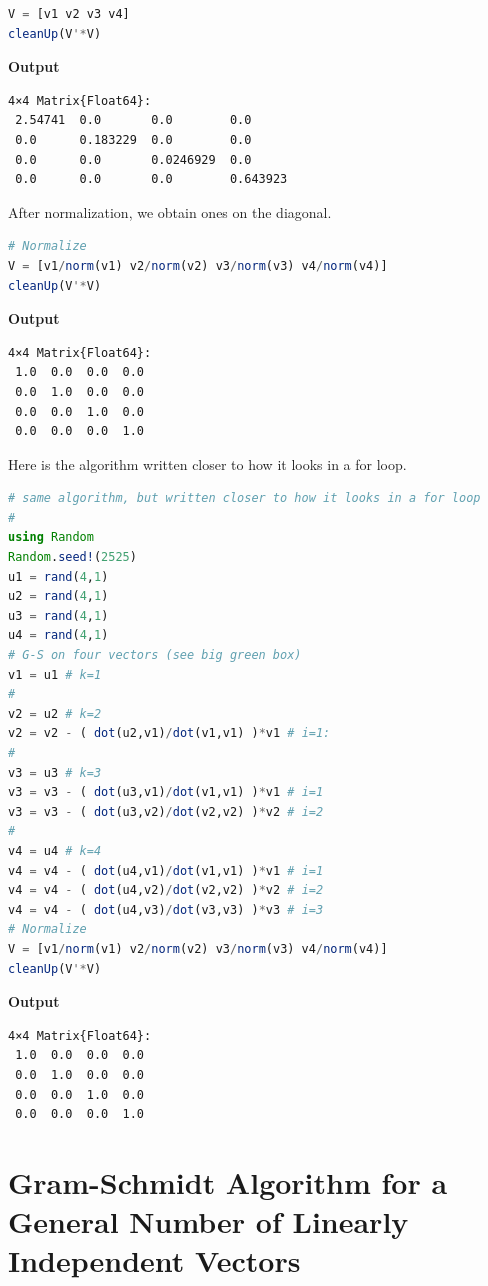 \begin{lstlisting}[language=Julia,style=mystyle]
V = [v1 v2 v3 v4]
cleanUp(V'*V)
\end{lstlisting}
\textbf{Output} 
\begin{verbatim}
4×4 Matrix{Float64}:
 2.54741  0.0       0.0        0.0
 0.0      0.183229  0.0        0.0
 0.0      0.0       0.0246929  0.0
 0.0      0.0       0.0        0.643923
\end{verbatim}

After normalization, we obtain ones on the diagonal.
\begin{lstlisting}[language=Julia,style=mystyle]
# Normalize
V = [v1/norm(v1) v2/norm(v2) v3/norm(v3) v4/norm(v4)] 
cleanUp(V'*V)
\end{lstlisting}
\textbf{Output} 
\begin{verbatim}
4×4 Matrix{Float64}:
 1.0  0.0  0.0  0.0
 0.0  1.0  0.0  0.0
 0.0  0.0  1.0  0.0
 0.0  0.0  0.0  1.0
\end{verbatim}

Here is the algorithm written closer to how it looks in a for loop.

\begin{lstlisting}[language=Julia,style=mystyle]
# same algorithm, but written closer to how it looks in a for loop
# 
using Random
Random.seed!(2525)
u1 = rand(4,1)
u2 = rand(4,1)
u3 = rand(4,1)
u4 = rand(4,1)
# G-S on four vectors (see big green box)
v1 = u1 # k=1
#
v2 = u2 # k=2
v2 = v2 - ( dot(u2,v1)/dot(v1,v1) )*v1 # i=1:
#
v3 = u3 # k=3 
v3 = v3 - ( dot(u3,v1)/dot(v1,v1) )*v1 # i=1
v3 = v3 - ( dot(u3,v2)/dot(v2,v2) )*v2 # i=2
#
v4 = u4 # k=4
v4 = v4 - ( dot(u4,v1)/dot(v1,v1) )*v1 # i=1
v4 = v4 - ( dot(u4,v2)/dot(v2,v2) )*v2 # i=2
v4 = v4 - ( dot(u4,v3)/dot(v3,v3) )*v3 # i=3
# Normalize
V = [v1/norm(v1) v2/norm(v2) v3/norm(v3) v4/norm(v4)] 
cleanUp(V'*V)
\end{lstlisting}
\textbf{Output} 
\begin{verbatim}
4×4 Matrix{Float64}:
 1.0  0.0  0.0  0.0
 0.0  1.0  0.0  0.0
 0.0  0.0  1.0  0.0
 0.0  0.0  0.0  1.0
\end{verbatim}

\section{Gram-Schmidt Algorithm for a General Number of Linearly Independent Vectors}

